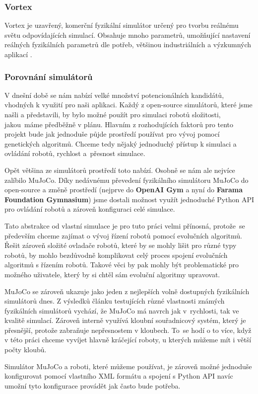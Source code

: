 \subsubsection{Vortex} \label{Vortex}
Vortex je uzavřený, komerční fyzikální simulátor určený pro tvorbu
reálnému světu odpovídajících simulací. Obsahuje mnoho parametrů,
umožňující nastavení reálných fyzikálních parametrů dle potřeb,
většinou industriálních a výzkumných aplikací \citep{coppeliarobotics}
\citep{yoon2023comparative}.

\subsubsection{Porovnání simulátorů} \label{Simulátory - Porovnání}
V dnešní době se nám nabízí velké množství potencionálních kandidátů, vhodných
k využití pro naši aplikaci. Každý z open-source simulátorů, které jsme našli a
představili, by bylo možné použít pro simulaci robotů složitosti, jakou~máme
předběžně v plánu. Hlavním z rozhodujících faktorů pro tento projekt bude jak
jednoduše půjde prostředí používat pro vývoj pomocí genetických algoritmů.
Chceme tedy nějaký jednoduchý přístup k simulaci a ovládání robotů, rychlost
a~přesnost simulace. 

Opět většina ze simulátorů prostředí toto nabízí. Osobně se nám ale nejvíce
zalíbilo MuJoCo. Díky nedávnému převedení fyzikálního simulátoru MuJoCo do
open-source a změně prostředí (nejprve do \textbf{OpenAI Gym} a nyní do
\textbf{Farama Foundation Gymnasium}) jsme dostali možnost využít jednoduché
Python API pro ovládání robotů a zároveň konfiguraci celé simulace. 

Tato abstrakce od vlastní simulace je pro tuto práci velmi přínosná, protože~se
především chceme zajímat o vývoj řízení robotů pomocí evolučních algoritmů.
Řešit zároveň složité ovladače robotů, které by se mohly lišit pro různé typy
robotů, by mohlo bezdůvodně komplikovat celý proces spojení evolučních
algoritmů s řízením robotů. Takové věci by pak mohly být problematické pro
možného uživatele, který by si chtěl sám evoluční algoritmy upravovat.

MuJoCo se zároveň ukazuje jako jeden z nejlepších volně dostupných fyzikálních
simulátorů dnes. Z výsledků článku testujících různé vlastnosti známých fyzikálních
simulátorů \citet{erez2015simulation} vychází, že MuJoCo má navrch jak
v~rychlosti, tak ve kvalitě simulací. Zároveň interně využívá kloubní
souřadnicový systém, který je přesnější, protože zabraňuje nepřesnostem v
kloubech. To~se hodí o to více, když v této práci chceme vyvíjet hlavně
kráčející roboty, u kterých můžeme mít i větší počty kloubů. 

Simulátor MuJoCo a roboti, které můžeme používat, je zároveň možné
jednoduše konfigurovat pomocí vlastního XML formátu a spojení s Python API
navíc umožní tyto konfigurace provádět jak často bude potřeba.
